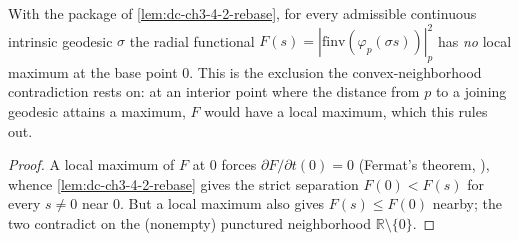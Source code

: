 \begin{lemma}
  \label{lem:dc-ch3-4-2-nomax}


  With the package of \cref{lem:dc-ch3-4-2-rebase}, for every admissible continuous intrinsic
  geodesic $\sigma$ the radial functional $F(s)=|\mathrm{finv}(\varphi_p(\sigma s))|_p^2$ has
  \emph{no} local maximum at the base point $0$. This is the exclusion the
  convex-neighborhood contradiction rests on: at an interior point where the distance from $p$ to
  a joining geodesic attains a maximum, $F$ would have a local maximum, which this rules out.
\end{lemma}
\begin{proof}
  \sketch

  A local maximum of $F$ at $0$ forces $\partial F/\partial t(0)=0$ (Fermat's theorem,
  ), whence \cref{lem:dc-ch3-4-2-rebase} gives the strict
  separation $F(0)<F(s)$ for every $s\neq0$ near $0$. But a local maximum also gives $F(s)\le F(0)$
  nearby; the two contradict on the (nonempty) punctured neighborhood $\mathbb R\setminus\{0\}$.

\end{proof}

